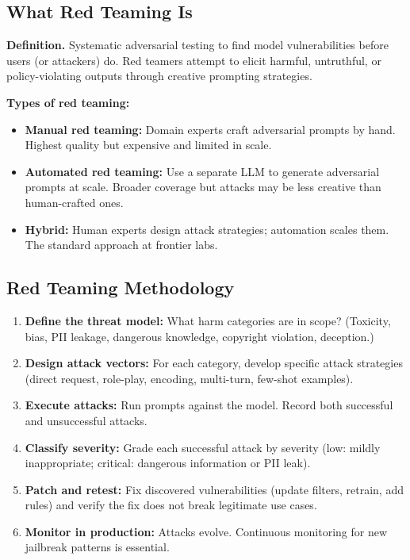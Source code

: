 \subsection{What Red Teaming Is}

\textbf{Definition.} Systematic adversarial testing to find model vulnerabilities before users (or attackers) do. Red teamers attempt to elicit harmful, untruthful, or policy-violating outputs through creative prompting strategies.

\textbf{Types of red teaming:}
\begin{itemize}
    \item \textbf{Manual red teaming:} Domain experts craft adversarial prompts by hand. Highest quality but expensive and limited in scale.
    \item \textbf{Automated red teaming:} Use a separate LLM to generate adversarial prompts at scale. Broader coverage but attacks may be less creative than human-crafted ones.
    \item \textbf{Hybrid:} Human experts design attack strategies; automation scales them. The standard approach at frontier labs.
\end{itemize}

\subsection{Red Teaming Methodology}

\begin{enumerate}
    \item \textbf{Define the threat model:} What harm categories are in scope? (Toxicity, bias, PII leakage, dangerous knowledge, copyright violation, deception.)
    \item \textbf{Design attack vectors:} For each category, develop specific attack strategies (direct request, role-play, encoding, multi-turn, few-shot examples).
    \item \textbf{Execute attacks:} Run prompts against the model. Record both successful and unsuccessful attacks.
    \item \textbf{Classify severity:} Grade each successful attack by severity (low: mildly inappropriate; critical: dangerous information or PII leak).
    \item \textbf{Patch and retest:} Fix discovered vulnerabilities (update filters, retrain, add rules) and verify the fix does not break legitimate use cases.
    \item \textbf{Monitor in production:} Attacks evolve. Continuous monitoring for new jailbreak patterns is essential.
\end{enumerate}

